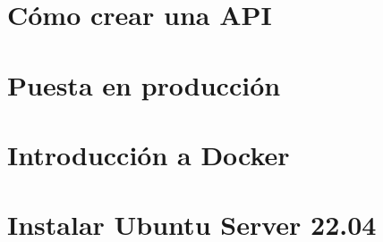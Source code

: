 \documentclass{\ClassPath/yukibook}
\begin{document}
    \part{Cómo crear una API}
    

    \part{Puesta en producción}
    

    \part{Introducción a Docker}
    \graphicspath{{../../otros/Docker/}}
    

    \part{Instalar Ubuntu  Server 22.04}
    \graphicspath{{../../anexos/instalar_ubuntu_lts/img/}}
    

    \graphicspath{{../../temas_comunes/administracion_remota/img/}}
    
\end{document}
